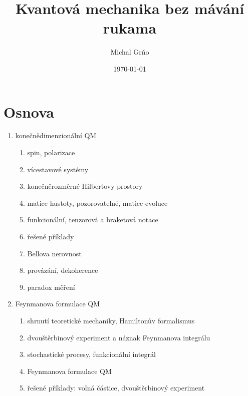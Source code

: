 \documentclass[10pt,a4paper]{report}
\theoremstyle{definition}
\begin{document}
\title{Kvantová mechanika bez mávání rukama}
\author{Michal Grňo}
\date{\today}

\maketitle

\section{Osnova}
\begin{enumerate}
    \item konečnědimenzionální QM
    \begin{enumerate}
        \item spin, polarizace
        \item vícestavové systémy
        \item konečněrozměrné Hilbertovy prostory
        \item matice hustoty, pozorovatelné, matice evoluce
        \item funkcionální, tenzorová a braketová notace
        \item řešené příklady
        \item Bellova nerovnost
        \item provázání, dekoherence
        \item paradox měření
    \end{enumerate}
    
    \item Feynmanova formulace QM
    \begin{enumerate}
        \item shrnutí teoretické mechaniky, Hamiltonův formalismus
        \item dvouštěrbinový experiment a náznak Feynmanova integrálu
        \item stochastické procesy, funkcionální integrál
        \item Feynmanova formulace QM
        \item řešené příklady: volná částice, dvouštěrbinový experiment
    \end{enumerate}
    

\end{enumerate}
\end{document}
